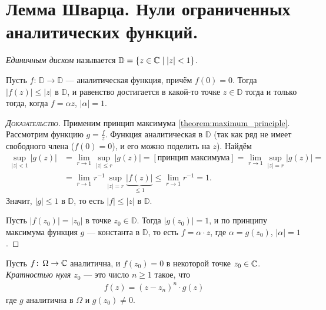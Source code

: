\documentclass[../complex-analysis.tex]{subfiles}
\begin{document}
\newpage
\section{Лемма Шварца. Нули ограниченных аналитических функций.}

\begin{df*}
 \textit{Единичным диском} называется $ \mathbb D = \left\{ z \in \mathbb{C} \;\middle|\; \left| z \right| < 1 \right\} $.
\end{df*}

\begin{lm}[Шварца]
\label{lemma:schwarz}
 Пусть $ f \colon\, \mathbb D \to \mathbb D $ --- аналитическая функция, причём $ f(0) = 0 $. Тогда $ \left| f(z) \right| \leqslant \left| z \right| $ в $ \mathbb D $, и равенство достигается в какой-то точке $ z \in \mathbb D $ тогда и только тогда, когда $f = \alpha z$, $ \left| \alpha  \right| = 1 $.
\end{lm}
\begin{proof}[\normalfont\textsc{Доказательство}]
Применим принцип максимума \eqref{theorem:maximum_principle}. Рассмотрим функцию $ g=\frac{f}{z} $. Функция аналитическая в $ \mathbb D $ (так как ряд не имеет свободного члена ($ f(0) = 0 $), и его можно поделить на $ z $). Найдём
 \begin{align*}
  \sup_{\left| z \right| < 1} \left| g(z) \right| &= \lim_{r \to 1} \sup_{\left| z \right| \leqslant r} \left| g(z) \right| = [\text{принцип максимума}] = \lim_{r\to 1} \sup_{\left| z \right| = r} \left| g(z) \right| = \\
  &= \lim_{r \to 1} r^{-1} \sup_{\left| z \right| = r} \underbrace{\left| f(z) \right|}_{\leq 1} \leqslant \lim_{r \to 1} r^{-1} = 1.
 \end{align*} Значит, $ \left| g \right| \leqslant 1 $ в $ \mathbb D $, то есть $ \left| f \right| \leqslant \left| z \right| $ в $ \mathbb D $.

 Пусть $ \left|f(z_0) \right| = \left| z_0 \right| $ в точке $ z_0 \in \mathbb D $. Тогда $ |g(z_0)| = 1 $, и по принципу максимума функция $ g $ --- константа в $ \mathbb D $, то есть $ f = \alpha \cdot z $, где $ \alpha = g(z_0) $, $ \left| \alpha \right|=1 $.
\end{proof}

\begin{df}
 Пусть $ f \colon\, \Omega \to \mathbb{C} $ аналитична, и $ f(z_0) = 0 $ в некоторой точке $ z_0 \in \mathbb{C} $. \textit{Кратностью нуля $ z_0 $} --- это число $ n \geqslant 1 $ такое, что
 \begin{align*}
  f(z) = (z-z_n)^{n} \cdot g(z)
 \end{align*} где $ g $ аналитична в $ \Omega $ и $ g(z_0) \neq 0 $.
\end{df}
\end{document}
